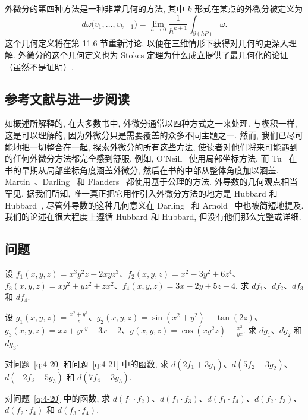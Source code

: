 外微分的第四种方法是一种非常几何的方法, 其中 $k$-形式在某点的外微分被定义为
\[
d\omega\bigl(v_1,\ldots,v_{k+1}\bigr)=\lim_{h\to 0}\frac{1}{h^{k+1}}\int_{\partial(hP)}\omega.
\]
这个几何定义将在第 11.6 节重新讨论, 以便在三维情形下获得对几何的更深入理解. 外微分的这个几何定义也为 Stokes 定理为什么成立提供了最几何化的论证（虽然不是证明）.

\subsection{参考文献与进一步阅读}

如概述所解释的, 在大多数书中, 外微分通常以四种方式之一来处理. 与楔积一样, 这是可以理解的, 因为外微分只是需要覆盖的众多不同主题之一. 然而, 我们已尽可能地把一切整合在一起, 探索外微分的所有这些方法, 使读者对他们将来可能遇到的任何外微分方法都完全感到舒服. 例如, O'Neill~\cite{ref36} 使用局部坐标方法, 而 Tu~\cite{ref46} 在书的早期从局部坐标角度涵盖外微分, 然后在书的中部从整体角度加以涵盖. Martin~\cite{ref33}、Darling~\cite{ref12} 和 Flanders~\cite{ref19} 都使用基于公理的方法. 外导数的几何观点相当罕见, 据我们所知, 唯一真正把它用作引入外微分方法的地方是 Hubbard 和 Hubbard~\cite{ref27}, 尽管外导数的这种几何意义在 Darling~\cite{ref12} 和 Arnold~\cite{ref03} 中也被简短地提及. 我们的论述在很大程度上遵循 Hubbard 和 Hubbard, 但没有他们那么完整或详细.

\subsection{问题}

\begin{question}\label{q:4-20}
设 $f_1(x,y,z)=x^3y^2z-2xyz^3$、$f_2(x,y,z)=x^2-3y^2+6z^4$、$f_3(x,y,z)=xy^2+yz^2+zx^2$、$f_4(x,y,z)=3x-2y+5z-4$. 求 $df_1$、$df_2$、$df_3$ 和 $df_4$.
\end{question}

\begin{question}\label{q:4-21}
设 $g_1(x,y,z)=\frac{x^2+y^2}{z}$、$g_2(x,y,z)=\sin(x^2+y^2)+\tan(2z)$、$g_3(x,y,z)=xz+ye^y+3x-2$、$g(x,y,z)=\cos(xy^2z)+\frac{x^2}{yz}$. 求 $dg_1$、$dg_2$ 和 $dg_3$.
\end{question}

\begin{question}\label{q:4-22}
对问题~\ref{q:4-20} 和问题~\ref{q:4-21} 中的函数, 求 $d(2f_1+3g_1)$、$d(5f_2+3g_2)$、$d(-2f_3-5g_3)$ 和 $d(7f_4-3g_3)$.
\end{question}

\begin{question}\label{q:4-23}
对问题~\ref{q:4-20} 中的函数, 求 $d(f_1\cdot f_2)$、$d(f_1\cdot f_3)$、$d(f_1\cdot f_4)$、$d(f_2\cdot f_3)$、$d(f_2\cdot f_4)$ 和 $d(f_3\cdot f_4)$.
\end{question}

